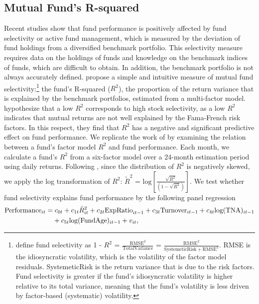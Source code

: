 \subsection{Mutual Fund's R-squared}
 Recent studies show that fund performance is positively affected by fund selectivity or active fund management, which is measured by the deviation of fund holdings from a diversified benchmark portfolio. This selectivity measure requires data on the holdings of funds and knowledge on the benchmark indices of funds, which are difficult to obtain. In addition, the benchmark portfolio is not always accurately defined. \citet{amihud2013mutual} propose a simple and intuitive measure of mutual fund selectivity:\footnote{\citet{amihud2013mutual} define fund selectivity as 1 - $R^2$ = $\frac{\text{RMSE}^2}{\text{TotalVariance}}$ = $\frac{\text{RMSE}^2}{\text{SystemeticRisk}+\text{RMSE}^2}$. \newline RMSE is the idiosyncratic volatility, which is the volatility of the factor model residuals. SystemeticRisk is the return variance that is due to the risk factors. Fund selectivity is greater if the fund's idiosyncratic volatility is higher relative to its total variance, meaning that the fund's volatility is less driven by factor-based (systematic) volatility.  } the fund's R-squared ($R^2$), the proportion of the return variance that is explained by the benchmark portfolios, estimated from a multi-factor model. \citet{amihud2013mutual} hypothesize that a low $R^2$ corresponds to high stock selectivity, as a low $R^2$ indicates that mutual returns are not well explained by the Fama-French risk factors. In this respect, they find that $R^2$ has a negative and significant predictive effect on fund performance. 
We replicate the work of \citet{amihud2013mutual} by examining the relation between a fund's factor model $R^2$ and fund performance. Each month, we calculate a fund's $R^2$ from a six-factor model over a 24-month estimation period using daily returns. Following \citet{amihud2013mutual}, since the distribution of $R^2$ is negatively skewed, we apply the log transformation of $R^2$: $\tilde{R}^2$ = $\text{log}\left[\frac{\sqrt{R^2}}{(1-\sqrt{R^2})}\right]$. We test whether fund selectivity explains fund performance by the following panel regression
\begin{alignat}{2}
     \label{R2}
     \text{Performance}_{it} = & \hspace{0.1cm} c_{0t} + c_{1t}\tilde{R}^2_{it} + c_{2t}\text{ExpRatio}_{it-1} + c_{3t}\text{Turnover}_{it-1} + c_{4t}\text{log}(\text{TNA})_{it-1} \nonumber \\ 
     &+ c_{5t}
    \text{log}(\text{FundAge})_{it-1} + v_{it},
 \end{alignat}
